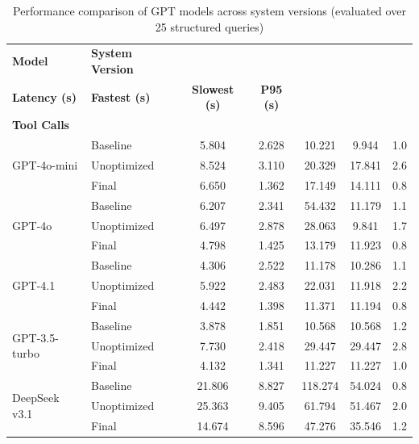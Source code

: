\documentclass[final-report]{report-template}
\begin{document}
\begin{table}[t]
\centering
\label{tab:models-clients-performance}
\begin{tabularx}{\textwidth}{l X c c c c c}
\toprule
\textbf{Model} & \textbf{System Version} & \makecell[c]{\textbf{Avg}\\\textbf{Latency (s)}} & \textbf{Fastest (s)} & \textbf{Slowest (s)} & \textbf{P95 (s)} & \makecell[c]{\textbf{Avg}\\\textbf{Tool Calls}} \\
\midrule

\multirow{3}{*}{GPT-4o-mini}
& Baseline     & 5.804  & 2.628 & 10.221  & 9.944   & 1.0 \\
& Unoptimized  & 8.524  & 3.110 & 20.329  & 17.841  & 2.6 \\
& Final        & 6.650  & 1.362 & 17.149  & 14.111  & 0.8 \\

\midrule
\multirow{3}{*}{GPT-4o}
& Baseline     & 6.207  & 2.341 & 54.432  & 11.179  & 1.1 \\
& Unoptimized  & 6.497  & 2.878 & 28.063  & 9.841   & 1.7 \\
& Final        & 4.798  & 1.425 & 13.179  & 11.923  & 0.8 \\

\midrule
\multirow{3}{*}{GPT-4.1}
& Baseline     & 4.306  & 2.522 & 11.178  & 10.286  & 1.1 \\
& Unoptimized  & 5.922  & 2.483 & 22.031  & 11.918  & 2.2 \\
& Final        & 4.442  & 1.398 & 11.371  & 11.194  & 0.8 \\

\midrule
\multirow{3}{*}{GPT-3.5-turbo}
& Baseline     & 3.878  & 1.851 & 10.568   & 10.568   & 1.2 \\
& Unoptimized  & 7.730  & 2.418 & 29.447  & 29.447  & 2.8 \\
& Final        & 4.132  & 1.341 & 11.227   & 11.227   & 1.0 \\

\midrule
\multirow{3}{*}{DeepSeek v3.1}
& Baseline     & 21.806 & 8.827 & 118.274 & 54.024  & 0.8 \\
& Unoptimized  & 25.363 & 9.405 & 61.794  & 51.467  & 2.0 \\
& Final        & 14.674 & 8.596 & 47.276  & 35.546  & 1.2 \\

\bottomrule
\end{tabularx}
\caption{Performance comparison of GPT models across system versions (evaluated over 25 structured queries)}
\end{table}
\end{document}
